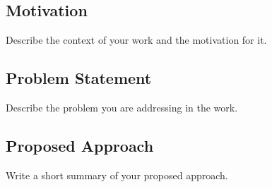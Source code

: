 \documentclass[../report.tex]{subfiles}
\begin{document}
    \subsection{Motivation}
    \label{sec:introduction:motivation}

    Describe the context of your work and the motivation for it.

    \subsection{Problem Statement}
    \label{sec:introduction:problem_statement}

    Describe the problem you are addressing in the work.

    \subsection{Proposed Approach}
    \label{sec:introduction:proposed_approach}

    Write a short summary of your proposed approach.
\end{document}
